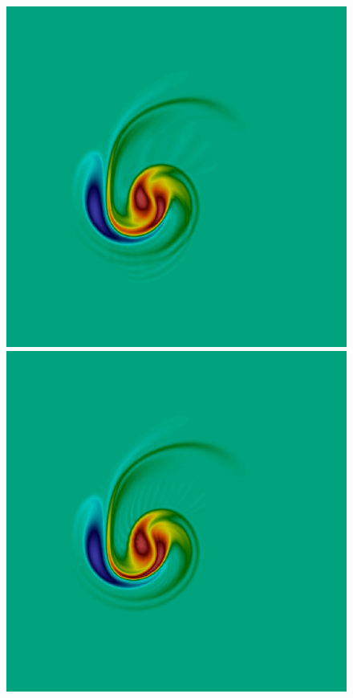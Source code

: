 \begin{figure}[t]
\includegraphics[scale=0.06]{data/Incompressible_Euler/Snapshots/red_17_4.png}\hspace{1em}
\includegraphics[scale=0.06]{data/Incompressible_Euler/Snapshots/red_35_4.png}\hspace{1em}

\end{figure}
